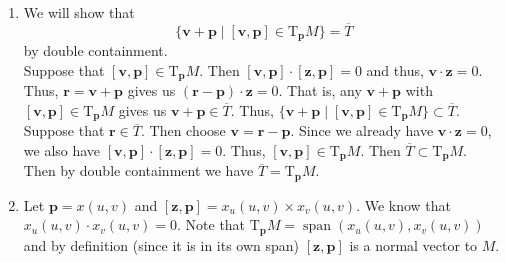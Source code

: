 \documentclass[12 pt, letterpaper]{hmcpset}
\begin{document}
\begin{solution}
	\begin{enumerate}
		\item
			We will show that
			\[
				\{ \mathbf{v} + \mathbf{p} \mid [\mathbf{v}, \mathbf{p}] \in \mathrm{T}_{\mathbf{p}} M \} = \overline{T}
			\]
			by double containment. \\

			Suppose that $[\mathbf{v}, \mathbf{p}] \in \mathrm{T}_{\mathbf{p}} M$. Then $[\mathbf{v}, \mathbf{p}] \cdot [\mathbf{z}, \mathbf{p}] = 0$ and thus, $\mathbf{v} \cdot \mathbf{z} = 0$. Thus, $\mathbf{r} = \mathbf{v} + \mathbf{p}$ gives us $(\mathbf{r} - \mathbf{p}) \cdot \mathbf{z} = 0$. That is, any $\mathbf{v} + \mathbf{p}$ with $[\mathbf{v}, \mathbf{p}] \in \mathrm{T}_{\mathbf{p}}M$ gives us $\mathbf{v} + \mathbf{p} \in \overline{T}$. Thus, $\{ \mathbf{v} + \mathbf{p} \mid [\mathbf{v}, \mathbf{p}] \in \mathrm{T}_{\mathbf{p}} M \} \subset \overline{T}$. \\

			Suppose that $\mathbf{r} \in \overline{T}$. Then choose $\mathbf{v} = \mathbf{r} - \mathbf{p}$. Since we already have $\mathbf{v} \cdot \mathbf{z} = 0$, we also have $[\mathbf{v}, \mathbf{p}] \cdot [\mathbf{z}, \mathbf{p}] = 0$. Thus, $[\mathbf{v}, \mathbf{p}] \in \mathrm{T}_{\mathbf{p}} M$. Then $\overline{T} \subset \mathrm{T}_{\mathbf{p}} M$. \\

			Then by double containment we have $\overline{T} = \mathrm{T}_{\mathbf{p}} M$.
		\item
			Let $\mathbf{p} = x(u, v)$ and $[\mathbf{z}, \mathbf{p}] = x_{u}(u, v) \times x_{v}(u, v)$. We know that $x_{u}(u, v) \cdot x_{v}(u, v) = 0$. Note that $\mathrm{T}_{\mathbf{p}} M = \operatorname{span}(x_{u}(u, v), x_{v}(u, v))$ and by definition (since it is in its own span) $[\mathbf{z}, \mathbf{p}]$ is a normal vector to $M$. \\


\end{enumerate}
\end{solution}
\end{document}
